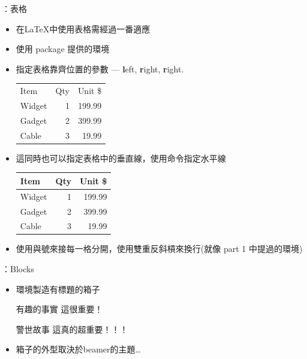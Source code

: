 \documentclass{beamer}
\begin{document}
\begin{frame}[fragile]{\insertsection：表格}
\begin{itemize}
\item 在\LaTeX{}中使用表格需經過一番適應
\item 使用 package 提供的環境
\item 指定表格靠齊位置的參數 --- \textbf{l}eft, \textbf{r}ight, \textbf{r}ight.
\begin{exampletwouptiny}
\begin{tabular}{lrr}
Item   & Qty & Unit \$ \\
Widget & 1   & 199.99  \\
Gadget & 2   & 399.99  \\
Cable  & 3   & 19.99   \\
\end{tabular}
\end{exampletwouptiny}
\item 這同時也可以指定表格中的垂直線，使用命令指定水平線
\begin{exampletwouptiny}
\begin{tabular}{|l|r|r|} \hline
Item   & Qty & Unit \$ \\\hline
Widget & 1   & 199.99  \\
Gadget & 2   & 399.99  \\
Cable  & 3   & 19.99   \\\hline
\end{tabular}
\end{exampletwouptiny}
\item 使用與號\keystrokebftt{\&}來接每一格分開，使用雙重反斜槓\keystrokebftt{\bs}\keystrokebftt{\bs}來換行(就像 part 1 中提過的環境)
\end{itemize}
\end{frame}

\begin{frame}[fragile]{\insertsection：Blocks}
\begin{itemize}
\item {}環境製造有標題的箱子
\begin{exampletwouptiny}
\begin{block}{有趣的事實}
這很重要！
\end{block}

\begin{alertblock}{警世故事}
這真的超重要！！！
\end{alertblock}
\end{exampletwouptiny}

\item 箱子的外型取決於beamer的主題\ldots
\end{itemize}
\end{frame}
\end{document}
